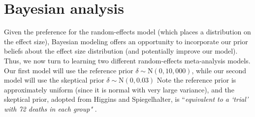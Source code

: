 \documentclass[fleqn,10pt]{SelfArx} %
\begin{document}

\section{Bayesian analysis}

Given the preference for the random-effects model (which places a distribution on the effect size), Bayesian modeling offers an opportunity to incorporate our prior beliefs about the effect size distribution (and potentially improve our model). Thus, we now turn to learning two different random-effects meta-analysis models. Our first model will use the reference prior $\delta \sim \textrm{N}(0, 10,000)$, while our second model will use the skeptical prior $\delta \sim \textrm{N}(0, 0.03)$
Note the reference prior is approximately uniform (since it is normal with very large variance), and the skeptical prior, adopted from Higgins and Spiegelhalter, is ``\emph{equivalent to a `trial' with 72 deaths in each group"} \cite{Original}.
\end{document}
